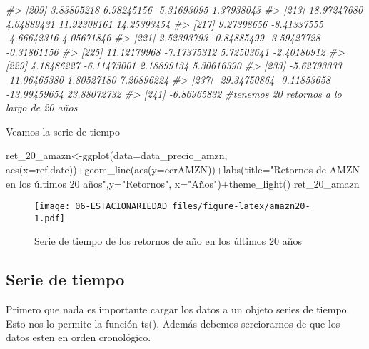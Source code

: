 \documentclass[
]{book}
\newenvironment{Shaded}{\begin{snugshade}}{\end{snugshade}}
\newcommand{\AttributeTok}[1]{\textcolor[rgb]{0.77,0.63,0.00}{#1}}
\newcommand{\CommentTok}[1]{\textcolor[rgb]{0.56,0.35,0.01}{\textit{#1}}}
\newcommand{\FunctionTok}[1]{\textcolor[rgb]{0.00,0.00,0.00}{#1}}
\newcommand{\NormalTok}[1]{#1}
\newcommand{\OtherTok}[1]{\textcolor[rgb]{0.56,0.35,0.01}{#1}}
\newcommand{\SpecialCharTok}[1]{\textcolor[rgb]{0.00,0.00,0.00}{#1}}
\newcommand{\StringTok}[1]{\textcolor[rgb]{0.31,0.60,0.02}{#1}}
\begin{document}
\begin{Shaded}
\begin{Highlighting}[]
\CommentTok{\#\textgreater{} [209]   3.83805218   6.98245156  {-}5.31693095   1.37938043}
\CommentTok{\#\textgreater{} [213]  18.97247680   4.64889431  11.92308161  14.25393454}
\CommentTok{\#\textgreater{} [217]   9.27398656  {-}8.41337555  {-}4.66642316   4.05671846}
\CommentTok{\#\textgreater{} [221]   2.52393793  {-}0.84885499  {-}3.59427728  {-}0.31861156}
\CommentTok{\#\textgreater{} [225]  11.12179968  {-}7.17375312   5.72503641  {-}2.40180912}
\CommentTok{\#\textgreater{} [229]   4.18486227  {-}6.11473001   2.18899134   5.30616390}
\CommentTok{\#\textgreater{} [233]  {-}5.62793333 {-}11.06465380   1.80527180   7.20896224}
\CommentTok{\#\textgreater{} [237] {-}29.34750864  {-}0.11853658 {-}13.99459654  23.88072732}
\CommentTok{\#\textgreater{} [241]  {-}6.86965832}
\CommentTok{\#tenemos 20 retornos a lo largo de 20 años}
\end{Highlighting}
\end{Shaded}

Veamos la serie de tiempo

\begin{Shaded}
\begin{Highlighting}[]
\NormalTok{ret\_20\_amazn}\OtherTok{\textless{}{-}}\FunctionTok{ggplot}\NormalTok{(}\AttributeTok{data=}\NormalTok{data\_precio\_amzn, }\FunctionTok{aes}\NormalTok{(}\AttributeTok{x=}\NormalTok{ref.date))}\SpecialCharTok{+}\FunctionTok{geom\_line}\NormalTok{(}\FunctionTok{aes}\NormalTok{(}\AttributeTok{y=}\NormalTok{ccrAMZN))}\SpecialCharTok{+}\FunctionTok{labs}\NormalTok{(}\AttributeTok{title=}\StringTok{"Retornos de AMZN en los últimos 20 años"}\NormalTok{,}\AttributeTok{y=}\StringTok{"Retornos"}\NormalTok{, }\AttributeTok{x=}\StringTok{"Años"}\NormalTok{)}\SpecialCharTok{+}\FunctionTok{theme\_light}\NormalTok{()}
\NormalTok{ret\_20\_amazn}
\end{Highlighting}
\end{Shaded}

\begin{figure}
\centering
\texttt{[image: 06-ESTACIONARIEDAD\_files/figure-latex/amazn20-1.pdf]}
\caption{\label{fig:amazn20}Serie de tiempo de los retornos de año en los últimos 20 años}
\end{figure}

\hypertarget{serie-de-tiempo}{%
\subsection{Serie de tiempo}\label{serie-de-tiempo}}

Primero que nada es importante cargar los datos a un objeto series de
tiempo. Esto nos lo permite la función ts(). Además debemos serciorarnos
de que los datos esten en orden cronológico.
\end{document}

